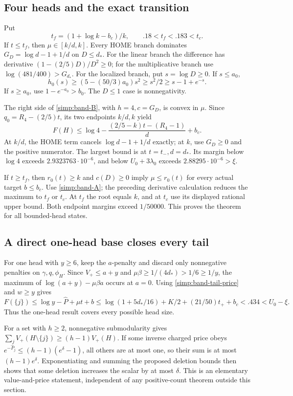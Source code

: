 \subsection{Four heads and the exact transition}

Put
\[
 t_f=(1+\log k-b_c)/k,
 \qquad .18<t_f<.183<t_c.
\]
If $t\le t_f$, then $\mu\in[k/d,k]$.
Every HOME branch dominates $G_D=\log d-1+1/d$ on $D\le d_*$.
For the linear branch the difference has derivative
$(1-(2/5)D)/D^2\ge0$; for the multiplicative branch use
$\log(481/400)>G_{d_*}$.
For the localized branch, put $s=\log D\ge0$.
If $s\le a_0$,
\[
 h_0(s)\ge(5-(50/3)a_0)s^2\ge s^2/2\ge s-1+e^{-s}.
\]
If $s\ge a_0$, use $1-e^{-a_0}>b_0$.
The $D\le1$ case is nonnegativity.

The right side of \eqref{simp:band-B}, with $h=4,c=G_D$, is
convex in $\mu$. Since $q_0=R_4-(2/5)t$, its two endpoints
$k/d,k$ yield
\begin{equation}\label{simp:band-four-floor}
 F(H)\le\log4-
 \frac{(2/5-k)t-(R_4-1)}d+b_c.
\end{equation}
At $k/d$, the HOME term cancels $\log d-1+1/d$ exactly;
at $k$, use $G_D\ge0$ and the positive numerator.
The largest bound is at $t=t_-,d=d_*$.
Its margin below $\log4$ exceeds $2.9323763\cdot10^{-6}$,
and below $U_0+3\lambda_0$ exceeds $2.88295\cdot10^{-6}>\xi$.

If $t\ge t_f$, then $r_0(t)\ge k$ and $c(D)\ge0$ imply
$\mu\le r_0(t)$ for every actual target $b\le b_c$.
Use \eqref{simp:band-A}; the preceding derivative calculation reduces
the maximum to $t_f$ or $t_c$. At $t_f$ the root equals $k$,
and at $t_c$ use its displayed rational upper bound.
Both endpoint margins exceed $1/50000$.
This proves the theorem for all bounded-head states.

\subsection{A direct one-head base closes every tail}

For one head with $y\ge6$, keep the $a$-penalty and discard
only nonnegative penalties on $\gamma,q,\phi_H$.
Since $V_+\le a+y$ and
$\mu\beta\ge1/(4d_*)>1/6\ge1/y$,
the maximum of $\log(a+y)-\mu\beta a$ occurs at $a=0$.
Using \eqref{simp:band-tail-price} and $w\ge y$ gives
\[
 F(\{j\})\le\log y-\widehat P+\mu t+b
 \le\log(1+5d_*/16)+K/2+(21/50)t_++b_c
 <.434<U_0-\xi.
\]
Thus the one-head result covers every possible head size.

For a set with $h\ge2$, nonnegative submodularity gives
$\sum_jV_+(H\setminus\{j\})\ge(h-1)V_+(H)$.
If some inverse charged price obeys
$e^{-\widehat P_j}\le(h-1)(e^\delta-1)$, all others are at
most one, so their sum is at most $(h-1)e^\delta$.
Exponentiating and summing the proposed deletion bounds then shows
that some deletion increases the scalar by at most $\delta$.
This is an elementary value-and-price statement, independent of any
positive-count theorem outside this section.

